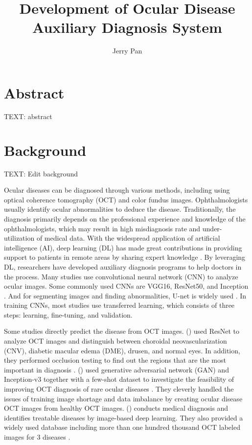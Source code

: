 \documentclass{article}
\newcommand{\authyear}[1]{\citeauthor{#1} (\citeyear{#1})}
\begin{document}
	\title{\vspace{-2.25cm} Development of Ocular Disease Auxiliary Diagnosis System}
	\author{Jerry Pan}
	\date{}
	\maketitle
	\vspace{0.5cm}
	
	\section*{Abstract}
	
	TEXT: abstract
	
	\pagebreak
	\tableofcontents
	\pagebreak
	
	\section{Background}
		
		TEXT: Edit background
		
		Ocular diseases can be diagnosed through various methods, including using optical coherence tomography (OCT) and color fundus images. Ophthalmologists usually identify ocular abnormalities to deduce the disease.  Traditionally, the diagnosis primarily depends on the professional experience and knowledge of the ophthalmologists, which may result in high misdiagnosis rate and under-utilization of medical data.  With the widespread application of artificial intelligence (AI), deep learning (DL) has made great contributions in providing support to patients in remote areas by sharing expert knowledge \autocite{Ichhpujani_Thakur_2021}.  By leveraging DL, researchers have developed auxiliary diagnosis programs to help doctors in the process. Many studies use convolutional neural network (CNN) to analyze ocular images. Some commonly used CNNs are VGG16, ResNet50, and Inception \autocite{daich2023artificial}.  And for segmenting images and finding abnormalities, U-net is widely used \autocite{Ronneberger_Fischer_Brox_2015}. In training CNNs, most studies use transferred learning, which consists of three steps: learning, fine-tuning, and validation.
		
		Some studies directly predict the disease from OCT images.
		\authyear{li2019deep} used ResNet to analyze OCT images and distinguish between choroidal neovascularization (CNV), diabetic macular edema (DME), drusen, and normal eyes. In addition, they performed occlusion testing to find out the regions that are the most important in diagnosis \autocite{li2019deep}. 
		\authyear{yoo2021feasibility} used generative adversarial network (GAN) and Inception-v3 together with a few-shot dataset to investigate the feasibility of improving OCT diagnosis of rare ocular diseases \autocite{yoo2021feasibility}.  They cleverly handled the issues of training image shortage and data imbalance by creating ocular disease OCT images from healthy OCT images. \authyear{Kermany2018} conducts medical diagnosis and identifies treatable diseases by image-based deep learning.  They also provided a widely used database including more than one hundred thousand OCT labeled images for 3 diseases \autocite{Kermany2018}.
		
\end{document}
